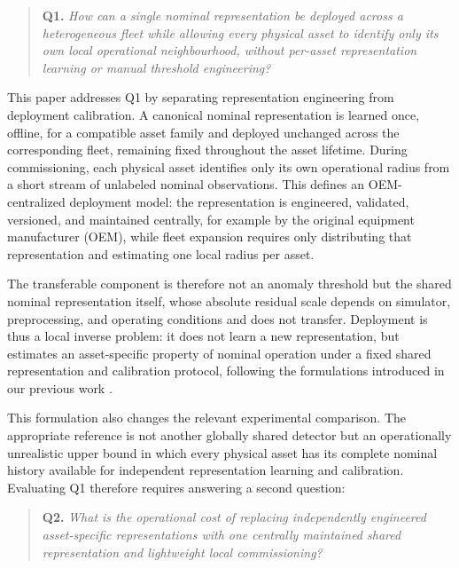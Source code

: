 \documentclass[numbered]{trbunofficial}
\begin{document}
\begin{quote}
\textbf{Q1.} \emph{How can a single nominal representation be deployed across a heterogeneous
fleet while allowing every physical asset to identify only its own local operational
neighbourhood, without per-asset representation learning or manual threshold engineering?}
\end{quote}

This paper addresses Q1 by separating representation engineering from deployment calibration. A
canonical nominal representation is learned once, offline, for a compatible asset family and
deployed unchanged across the corresponding fleet, remaining fixed throughout the asset lifetime.
During commissioning, each physical asset identifies only its own operational radius from a short
stream of unlabeled nominal observations. This defines an OEM-centralized deployment model: the
representation is engineered, validated, versioned, and maintained centrally, for example by the
original equipment manufacturer (OEM), while fleet expansion requires only distributing that
representation and estimating one local radius per asset.

The transferable component is therefore not an anomaly threshold but the shared nominal
representation itself, whose absolute residual scale depends on simulator, preprocessing, and
operating conditions and does not transfer. Deployment is thus a local inverse problem: it does
not learn a new representation, but estimates an asset-specific property of nominal operation
under a fixed shared representation and calibration protocol, following the formulations
introduced in our previous work \citep{disanti2026quotient,disanti2026inverse}.


This formulation also changes the relevant experimental comparison. The appropriate reference is
not another globally shared detector but an operationally unrealistic upper bound in which every
physical asset has its complete nominal history available for independent representation learning
and calibration. Evaluating Q1 therefore requires answering a second question:

\begin{quote}
\textbf{Q2.} \emph{What is the operational cost of replacing independently engineered
asset-specific representations with one centrally maintained shared representation and
lightweight local commissioning?}
\end{quote}
\end{document}
